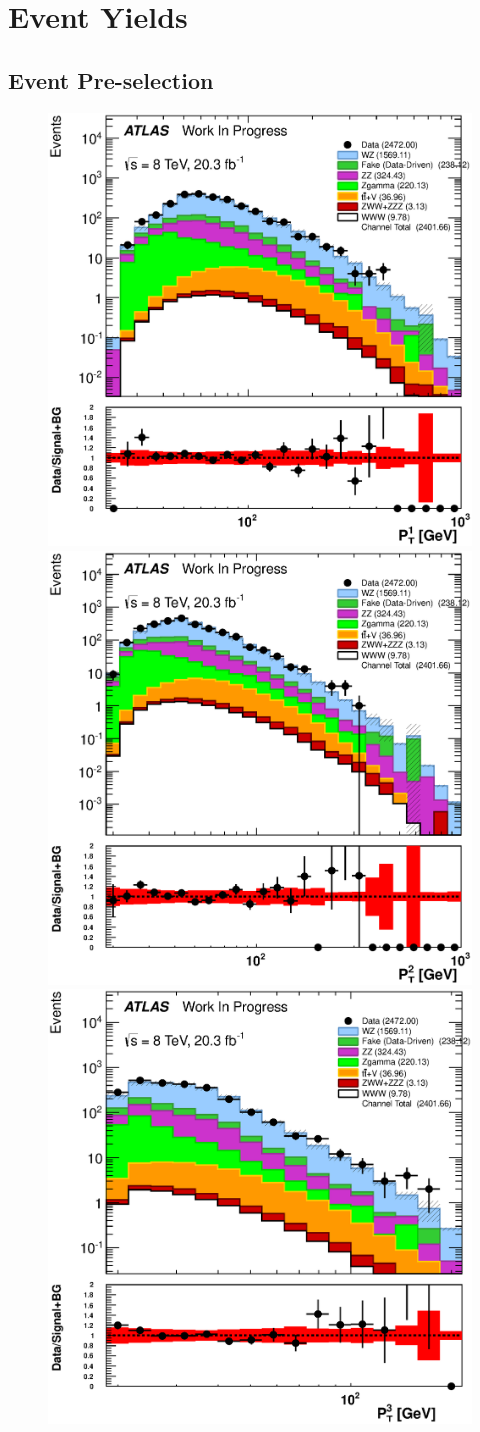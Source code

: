 \section{Event Yields}
\label{sec:event_yield}


\subsection{Event Pre-selection}
\label{sec:preselection_yield}

\begin{figure}[ht!]
\centering
\includegraphics[width=0.3\columnwidth]{figures/appendix_signal_selection/Nov24Update_FakeSys_KFacSys_LogY_NoRebin/output/jobs/MxM/DataFull_Rates_May13_FakeRatesExactly2Loose_MuonMxMBJetGt0_ElBJetGt0SubtractPC_MxM/PreselectionNov23_15_physics/weight_all/eps/LeadingLeptonPt_histratio.eps}
\includegraphics[width=0.3\columnwidth]{figures/appendix_signal_selection/Nov24Update_FakeSys_KFacSys_LogY_NoRebin/output/jobs/MxM/DataFull_Rates_May13_FakeRatesExactly2Loose_MuonMxMBJetGt0_ElBJetGt0SubtractPC_MxM/PreselectionNov23_15_physics/weight_all/eps/SubleadingLeptonPt_histratio.eps}
\includegraphics[width=0.3\columnwidth]{figures/appendix_signal_selection/Nov24Update_FakeSys_KFacSys_LogY_NoRebin/output/jobs/MxM/DataFull_Rates_May13_FakeRatesExactly2Loose_MuonMxMBJetGt0_ElBJetGt0SubtractPC_MxM/PreselectionNov23_15_physics/weight_all/eps/MinimumLeptonPt_histratio.eps}

\end{figure}
